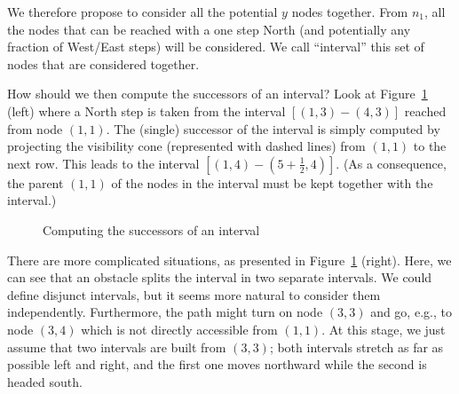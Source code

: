 We therefore propose to consider all the potential $y$ nodes together.  
From $n_1$, all the nodes that can be reached with a one step North 
(and potentially any fraction of West/East steps) will be considered.  
We call ``interval'' this set of nodes that are considered together.  

How should we then compute the successors of an interval?  
Look at Figure~\ref{fig::succ1} (left) 
where a North step is taken from the interval $[(1,3)-(4,3)]$
reached from node $(1,1)$.  
The (single) successor of the interval 
is simply computed by projecting the visibility cone 
(represented with dashed lines)
from $(1,1)$ to the next row.  
This leads to the interval $[(1,4)-(5+\frac{1}{2},4)]$.  
(As a consequence, the parent $(1,1)$ of the nodes in the interval 
must be kept together with the interval.)  


\begin{figure}[ht]
  \begin{minipage}{0.5\linewidth}
  \begin{center}
    
  \end{center}
  \end{minipage}
  \begin{minipage}{0.5\linewidth}
  \begin{center}
    
  \end{center}
  \end{minipage}
  \caption{Computing the successors of an interval}
  \label{fig::succ1}
\end{figure}

There are more complicated situations, 
as presented in Figure~\ref{fig::succ1} (right).  
Here, we can see that an obstacle splits the interval 
in two separate intervals.  
We could define disjunct intervals, 
but it seems more natural to consider them independently.  
Furthermore, the path might turn on node $(3,3)$
and go, e.g., to node $(3,4)$ 
which is not directly accessible from $(1,1)$.  
At this stage, we just assume that two intervals 
are built from $(3,3)$; 
both intervals stretch as far as possible left and right, 
and the first one moves northward 
while the second is headed south.  

